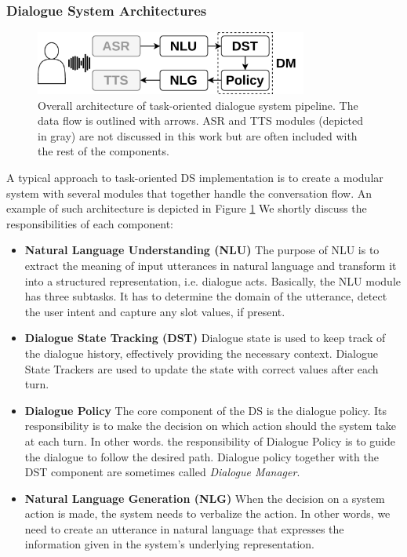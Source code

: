 \subsubsection{Dialogue System Architectures}
\begin{figure}[t]
    \centering
    \includegraphics[width=0.80\textwidth]{images/pipeline.png}
    \caption{Overall architecture of task-oriented dialogue system pipeline. The data flow is outlined with arrows. ASR and TTS modules (depicted in gray) are not discussed in this work but are often included with the rest of the components.}
    \label{fig:overall}
\end{figure}
A typical approach to task-oriented DS implementation is to create a modular system with several modules that together handle the conversation flow.
An example of such architecture is depicted in Figure \ref{fig:overall}
We shortly discuss the responsibilities of each component:
\begin{itemize}
    \item \textbf{Natural Language Understanding (NLU)} The purpose of NLU is to extract the meaning of input utterances in natural language and transform it into a structured representation, i.e. dialogue acts.
    Basically, the NLU module has three subtasks.
    It has to determine the domain of the utterance, detect the user intent and capture any slot values, if present.
    \item \textbf{Dialogue State Tracking (DST)} Dialogue state is used to keep track of the dialogue history, effectively providing the necessary context.
    Dialogue State Trackers are used to update the state with correct values after each turn.
    \item \textbf{Dialogue Policy} The core component of the DS is the dialogue policy.
    Its responsibility is to make the decision on which action should the system take at each turn.
    In other words. the responsibility of Dialogue Policy is to guide the dialogue to follow the desired path.
    Dialogue policy together with the DST component are sometimes called \emph{Dialogue Manager}.
    \item \textbf{Natural Language Generation (NLG)} When the decision on a system action is made, the system needs to verbalize the action.
    In other words, we need to create an utterance in natural language that expresses the information given in the system's underlying representation.
\end{itemize}

